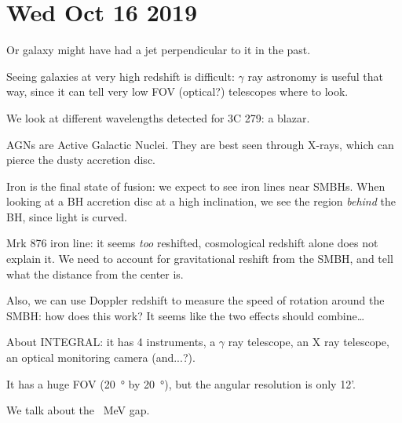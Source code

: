 \documentclass[main.tex]{subfiles}
\begin{document}
\section*{Wed Oct 16 2019}

Or galaxy might have had a jet perpendicular to it in the past.

Seeing galaxies at very high redshift is difficult: \(\gamma \) ray astronomy is useful that way, since it can tell very low FOV (optical?) telescopes where to look.

We look at different wavelengths detected for 3C 279: a blazar.

AGNs are Active Galactic Nuclei. They are best seen through X-rays, which can pierce the dusty accretion disc.

Iron is the final state of fusion: we expect to see iron lines near SMBHs.
When looking at a BH accretion disc at a high inclination, we see the region \emph{behind} the BH, since light is curved.

Mrk 876 iron line: it seems \emph{too} reshifted, cosmological redshift alone does not explain it. We need to account for gravitational reshift from the SMBH, and tell what the distance from the center is.

\begin{greenbox}
    Also, we can use Doppler redshift to measure the speed of rotation around the SMBH: how does this work? It seems like the two effects should combine\dots
\end{greenbox}  

About INTEGRAL: it has 4 instruments, a \(\gamma \) ray telescope, an X ray telescope, an optical monitoring camera (and...?).

It has a huge FOV (\SI{20}{\degree} by \SI{20}{\degree}), but the angular resolution is only 12'. 

We talk about the \SI{}{MeV} gap.
\end{document}

